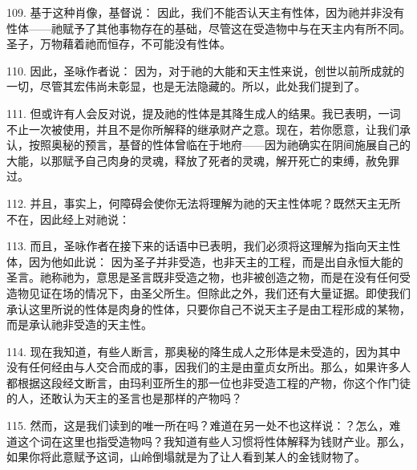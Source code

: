 109. 基于这种肖像，基督说： 因此，我们不能否认天主有性体，因为祂并非没有性体——祂赋予了其他事物存在的基础，尽管这在受造物中与在天主内有所不同。圣子，万物藉着祂而恒存，不可能没有性体。\par

110. 因此，圣咏作者说： 因为，对于祂的大能和天主性来说，创世以前所成就的一切，尽管其宏伟尚未彰显，也是无法隐藏的。所以，此处我们提到了。\par

111. 但或许有人会反对说，提及祂的性体是其降生成人的结果。我已表明，一词不止一次被使用，并且不是你所解释的继承财产之意。现在，若你愿意，让我们承认，按照奥秘的预言，基督的性体曾临在于地府——因为祂确实在阴间施展自己的大能，以那赋予自己肉身的灵魂，释放了死者的灵魂，解开死亡的束缚，赦免罪过。\par

112. 并且，事实上，何障碍会使你无法将理解为祂的天主性体呢？既然天主无所不在，因此经上对祂说：\par

113. 而且，圣咏作者在接下来的话语中已表明，我们必须将这理解为指向天主性体，因为他如此说： 因为圣子并非受造，也非天主的工程，而是出自永恒大能的圣言。祂称祂为，意思是圣言既非受造之物，也非被创造之物，而是在没有任何受造物见证在场的情况下，由圣父所生。但除此之外，我们还有大量证据。即使我们承认这里所说的性体是肉身的性体，只要你自己不说天主子是由工程形成的某物，而是承认祂非受造的天主性。\par

114. 现在我知道，有些人断言，那奥秘的降生成人之形体是未受造的，因为其中没有任何经由与人交合而成的事，因我们的主是由童贞女所出。那么，如果许多人都根据这段经文断言，由玛利亚所生的那一位也非受造工程的产物，你这个作门徒的人，还敢认为天主的圣言也是那样的产物吗？\par

115. 然而，这是我们读到的唯一所在吗？难道在另一处不也这样说：？怎么，难道这个词在这里也指受造物吗？我知道有些人习惯将性体解释为钱财产业。那么，如果你将此意赋予这词，山岭倒塌就是为了让人看到某人的金钱财物了。\par

